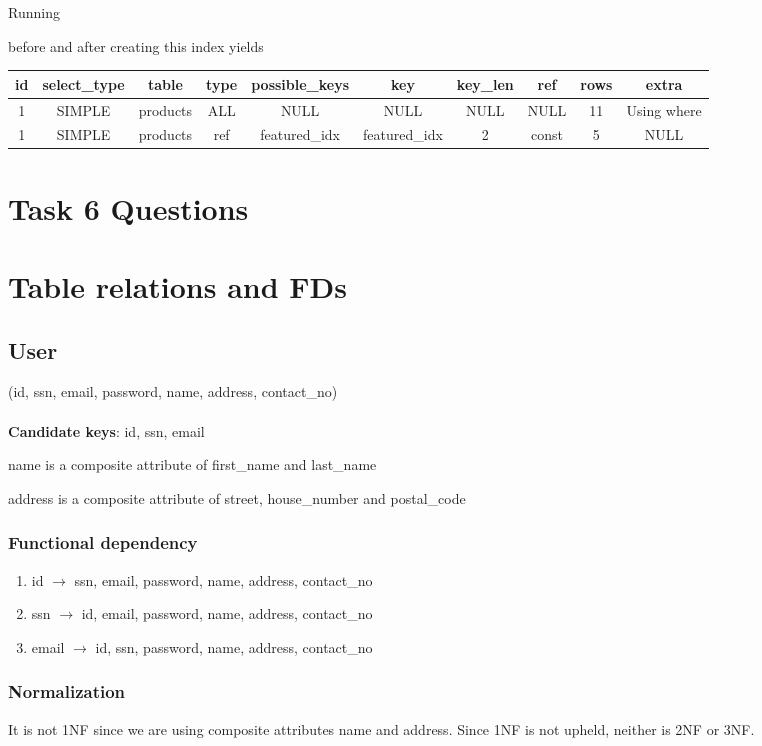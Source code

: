 \documentclass{article}
\newcommand{\sql}[1]{}
\begin{document}
Running
\sql{explain}
before and after creating this index yields\\
\begin{tabular}{ | c c c c c c c c c c | }
  \hline
  id & select\_type & table & type & possible\_keys & key & key\_len & ref & rows & extra\\
  \hline
  1 & SIMPLE & products & ALL & NULL & NULL & NULL & NULL & 11 & Using where\\
  1 & SIMPLE & products & ref & featured\_idx & featured\_idx & 2 & const & 5 & NULL\\
  \hline
\end{tabular}

\section*{Task 6 Questions}

\section{Table relations and FDs}

\subsection{User}
(id, ssn, email, password, name, address, contact\_no)\\\\
\textbf{Candidate keys}: {id}, {ssn}, {email}

name is a composite attribute of first\_name and last\_name



address is a composite attribute of street, house\_number and postal\_code


\subsubsection*{Functional dependency}
\begin{enumerate}[$\bullet$]
  \item
id $\rightarrow$ ssn, email, password, name, address, contact\_no
\item
ssn $\rightarrow$ id, email, password, name, address, contact\_no
\item
email $\rightarrow$ id, ssn, password, name, address, contact\_no
\end{enumerate}
\subsubsection*{Normalization}
It is not 1NF since we are using composite attributes name and address. Since 1NF is not upheld, neither is 2NF or 3NF.
\end{document}
